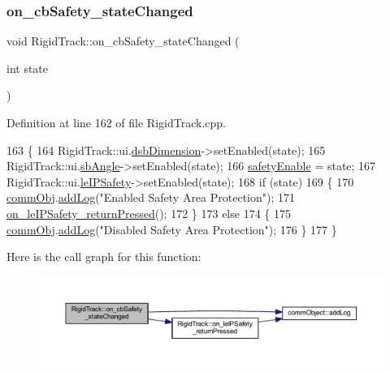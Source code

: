 \subsubsection{\texorpdfstring{on\+\_\+cb\+Safety\+\_\+state\+Changed}{on\_cbSafety\_stateChanged}}
{\footnotesize\ttfamily void Rigid\+Track\+::on\+\_\+cb\+Safety\+\_\+state\+Changed (\begin{DoxyParamCaption}\item[{int}]{state }\end{DoxyParamCaption})\hspace{0.3cm}{\ttfamily [slot]}}



Definition at line 162 of file Rigid\+Track.\+cpp.


\begin{DoxyCode}
163 \{
164     RigidTrack::ui.\hyperlink{class_ui___rigid_track_class_a20f78b58534d29da3d836c2af79a6232}{dsbDimension}->setEnabled(state);
165     RigidTrack::ui.\hyperlink{class_ui___rigid_track_class_ac232f3d19d53b00aa61431725cbf71c4}{sbAngle}->setEnabled(state);
166     \hyperlink{main_8cpp_aa6266eedab8b3c011be53baffbfc42ab}{safetyEnable} = state;
167     RigidTrack::ui.\hyperlink{class_ui___rigid_track_class_af722611603b357175b3ce505bdf468b1}{leIPSafety}->setEnabled(state);
168     \textcolor{keywordflow}{if} (state)
169     \{
170         \hyperlink{main_8cpp_af29e7fc07ae0979d5fb61b473241d33d}{commObj}.\hyperlink{classcomm_object_aec354c7099b3039083cc4224e071e022}{addLog}(\textcolor{stringliteral}{"Enabled Safety Area Protection"});
171         \hyperlink{class_rigid_track_aa527ab3a2ddc7b31bf1063260efc9755}{on\_leIPSafety\_returnPressed}();
172     \}
173     \textcolor{keywordflow}{else}
174     \{
175         \hyperlink{main_8cpp_af29e7fc07ae0979d5fb61b473241d33d}{commObj}.\hyperlink{classcomm_object_aec354c7099b3039083cc4224e071e022}{addLog}(\textcolor{stringliteral}{"Disabled Safety Area Protection"});
176     \}
177 \}
\end{DoxyCode}
Here is the call graph for this function\+:\nopagebreak
\begin{figure}[H]
\begin{center}
\leavevmode
\includegraphics[width=350pt]{class_rigid_track_a8f999fa968f4cc9fa548bdc8438b32c4_cgraph}
\end{center}
\end{figure}
\mbox{\label{class_rigid_track_ae5e44de9f4e3cacdd647c0305936b02b}} 
